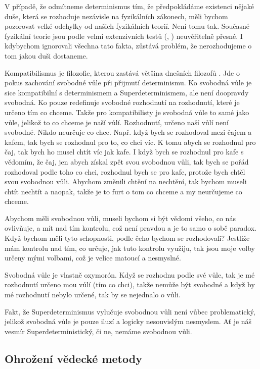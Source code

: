 V případě, že odmítneme determinismus tím, že předpokládáme existenci nějaké duše, která se rozhoduje nezávisle na fyzikálních zákonech, měli bychom pozorovat velké odchylky od našich fyzikálních teorií. Není tomu tak. Současné fyzikální teorie jsou podle velmi extenzivních testů \parencite{GenRelAcc}(, \cite*{QEDAcc}) neuvěřitelně přesné. I kdybychom ignorovali všechna tato fakta, zůstává problém, že nerozhodujeme o tom jakou duši dostaneme.

Kompatibilismus je filozofie, kterou zastává většina dnešních filozofů \parencite{FWSur}. Jde o pokus zachování svobodné vůle při přijmutí determinismu. Ko svobodná vůle je sice kompatibilní s determinismem a Superdeterminismem, ale není doopravdy svobodná. Ko pouze redefinuje svobodné rozhodnutí na rozhodnutí, které je určeno tím co chceme. Takže pro kompatibilisty je svobodná vůle to samé jako vůle, jelikož to co chceme je naší vůlí. Rozhodnutí, určeno naší vůlí není svobodné. Nikdo neurčuje co chce. Např. když bych se rozhodoval mezi čajem a kafem, tak bych se rozhodnul pro to, co chci víc. K tomu abych se rozhodnul pro čaj, tak bych ho musel chtít víc jak kafe. I když bych se rozhodnul pro kafe s vědomím, že  čaj, jen abych získal zpět svou svobodnou vůli, tak bych se pořád rozhodoval podle toho co chci, rozhodnul bych se pro kafe, protože bych chtěl  svou svobodnou vůli. Abychom změnili chtění na nechtění, tak bychom museli chtít nechtít a naopak, takže je to furt o tom co chceme a my neurčujeme co chceme.

Abychom měli svobodnou vůli, museli bychom si být vědomi všeho, co nás ovlivňuje, a mít nad tím kontrolu, což není pravdou a je to samo o sobě paradox. Když bychom měli tyto schopnosti, podle čeho bychom se rozhodovali? Jestliže mám kontrolu nad tím, co určuje, jak tuto kontrolu využiju, tak jsou moje volby určeny mými volbami, což je velice matoucí a nesmyslné.

Svobodná vůle je vlastně oxymorón. Když se rozhodnu podle své vůle, tak je mé rozhodnutí určeno mou vůlí (tím co chci), takže nemůže být svobodné a když by mé rozhodnutí nebylo určené, tak by se nejednalo o vůli.

Fakt, že Superdeterminismus vylučuje svobodnou vůli není vůbec problematický, jelikož svobodná vůle je pouze iluzí a logicky nesouvislým nesmyslem. Ať je náš vesmír Superdeterministický, či ne, nemáme svobodnou vůli.

\clearpage

\subsection{Ohrožení vědecké metody}

